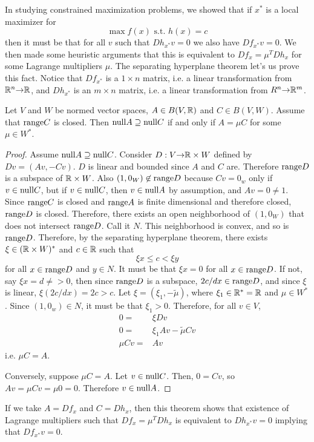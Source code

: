 In studying constrained maximization problems, we showed that if $x^*$
is a local maximizer for 
\[ \max f(x) \text{ s.t. } h(x) = c \]
then it must be that for all $v$ such that $Dh_{x^*} v = 0$ we also have
$Df_{x^*} v = 0$. We then made some heuristic arguments that this is
equivalent to $Df_x = \mu^T Dh_x$ for some Lagrange multipliers
$\mu$. The separating hyperplane theorem let's us prove this
fact. Notice that $Df_{x^*}$ is a $1 \times n$ matrix, i.e. a linear
transformation from $\mathbb{R}^n {\rightarrow} \mathbb{R}$, and $Dh_{x^*}$ is an $m \times n$
matrix, i.e. a linear transformation from $R^n {\rightarrow} \mathbb{R}^m$. 
\begin{theorem}\label{thm:multipliers}
  Let $V$ and $W$ be normed vector spaces, $A \in B(V,\mathbb{R})$ and
  $C \in B(V,W)$. Assume that $\mathrm{range} C$ is closed. Then
  $\mathrm{null} A \supseteq \mathrm{null} C$ if and only if $A = \mu C$ for some
  $\mu \in W^*$.
\end{theorem}
\begin{proof}
  Assume $\mathrm{null} A \supseteq \mathrm{null} C$. Consider $D:V {\rightarrow} \mathbb{R} \times W$
  defined by $Dv = (Av, -Cv)$. $D$ is linear and bounded since $A$ and
  $C$ are.  Therefore $\mathrm{range} D$ is a subspace of $\mathbb{R} \times W$. Also
  $(1,0_W) \not\in \mathrm{range} D$ because $Cv = 0_w$ only if
  $v \in \mathrm{null} C$, but if $v \in \mathrm{null} C$, then $v \in \mathrm{null} A$ by
  assumption, and $Av = 0 \neq 1$. Since $\mathrm{range} C$ is closed and
  $\mathrm{range} A$ is finite dimensional and therefore closed, $\mathrm{range} D$ is
  closed. Therefore, there exists an open neighborhood of $(1,0_W)$
  that does not intersect $\mathrm{range} D$. Call it $N$. This neighborhood
  is convex, and so is $\mathrm{range} D$. Therefore, by the separating
  hyperplane theorem, there exists $\xi \in (\mathbb{R} \times W)^*$ and
  $c \in \mathbb{R}$ such that
  \[ \xi x \leq c < \xi y \]
  for all $x \in \mathrm{range} D$ and $y \in N$.  It must be that $\xi x = 0$
  for all $x \in \mathrm{range} D$. If not, say $\xi x = d \neq >0$, then
  since $\mathrm{range} D$ is a subspace, $2c/d x \in \mathrm{range} D$, and since
  $\xi$ is linear, $\xi(2c/d x) = 2c > c$.  Let
  $\xi = (\xi_1, -\tilde{\mu})$, where $\xi_1 \in \mathbb{R}^* = \mathbb{R}$ and
  $\mu \in W^*$. Since $(1,0_w) \in N$, it must be that $\xi_1 >
  0$. Therefore, for all $v \in V$,
  \begin{align*}
    0 = & \xi Dv \\
    0 = & \xi_1 Av - \tilde{\mu} Cv \\
    \mu C v = & Av 
  \end{align*}
  i.e. $\mu C = A$.

  Conversely, suppose $\mu C = A$. Let $v \in \mathrm{null} C$. Then, 
  $ 0 = C v $, so $A v = \mu C v = \mu 0 = 0$. Therefore $v \in \mathrm{null} A$.
\end{proof}
If we take $A = Df_x$ and $C = Dh_x$, then this theorem shows that
existence of Lagrange multipliers such that $Df_x = \mu^T Dh_x$ is
equivalent to $Dh_{x^*} v = 0$ implying that $Df_{x^*} v = 0$. 

